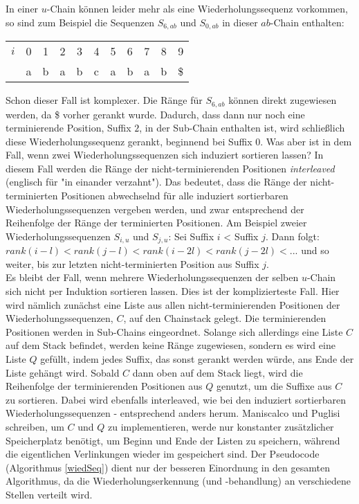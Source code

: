 In einer $u$-Chain können leider mehr als eine Wiederholungssequenz vorkommen, so sind zum Beispiel die Sequenzen $S_{6, ab}$ und $S_{0, ab}$ in dieser $ab$-Chain enthalten:
\begin{center}
\begin{tabular}{c c c c c c c c c c c}
$i$ & 0 & 1 & 2 & 3 & 4 & 5 & 6 & 7 & 8 & 9\\
 & a & b & a & b & \cellcolor{black!20!white}c & a & b & a & b & \cellcolor{black!20!white}\$\\
\end{tabular}
\end{center}

Schon dieser Fall ist komplexer. Die Ränge für $S_{6,ab}$ können direkt zugewiesen werden, da \$ vorher gerankt wurde. Dadurch, dass dann nur noch eine terminierende Position, Suffix $2$, in der Sub-Chain enthalten ist, wird schließlich diese Wiederholungssequenz gerankt, beginnend bei Suffix $0$.
Was aber ist in dem Fall, wenn zwei Wiederholungssequenzen sich induziert sortieren lassen? In diesem Fall werden die Ränge der nicht-terminierenden Positionen \textit{interleaved} (englisch für "in einander verzahnt"). Das bedeutet, dass die Ränge der nicht-terminierten Positionen abwechselnd für alle induziert sortierbaren Wiederholungssequenzen vergeben werden, und zwar entsprechend der Reihenfolge der Ränge der terminierten Positionen. Am Beispiel zweier Wiederholungssequenzen $S_{i,u}$ und $S_{j,u}$: Sei Suffix $i$ < Suffix $j$. Dann folgt: $rank(i-l) < rank(j-l) < rank(i-2l) < rank(j-2l) < ...$ und so weiter, bis zur letzten nicht-terminierten Position aus Suffix $j$.\\
Es bleibt der Fall, wenn mehrere Wiederholungssequenzen der selben $u$-Chain sich nicht per Induktion sortieren lassen. Dies ist der komplizierteste Fall. Hier wird nämlich zunächst eine Liste aus allen nicht-terminierenden Positionen der Wiederholungssequenzen, $C$, auf den Chainstack gelegt. Die terminierenden Positionen werden in Sub-Chains eingeordnet. Solange sich allerdings eine Liste $C$ auf dem Stack befindet, werden keine Ränge zugewiesen, sondern es wird eine Liste $Q$ gefüllt, indem jedes Suffix, das sonst gerankt werden würde, ans Ende der Liste gehängt wird. Sobald $C$ dann oben auf dem Stack liegt, wird die Reihenfolge der terminierenden Positionen aus $Q$ genutzt, um die Suffixe aus $C$ zu sortieren. Dabei wird ebenfalls interleaved, wie bei den induziert sortierbaren Wiederholungssequenzen - entsprechend anders herum. Maniscalco und Puglisi schreiben, um $C$ und $Q$ zu implementieren, werde nur konstanter zusätzlicher Speicherplatz benötigt, um Beginn und Ende der Listen zu speichern, während die eigentlichen Verlinkungen wieder im \isa gespeichert sind. Der Pseudocode (Algorithmus \ref{wiedSeq}) dient nur der besseren Einordnung in den gesamten Algorithmus, da die Wiederholungserkennung (und -behandlung) an verschiedene Stellen verteilt wird.


